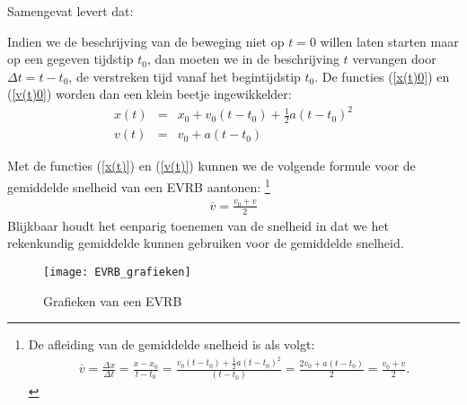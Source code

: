 \documentclass{ximera}
\begin{document}
	Samengevat levert dat:
	
	
	Indien we de beschrijving van de beweging niet op $t=0$ willen laten starten maar op een gegeven tijdstip $t_0$, dan moeten we in de beschrijving $t$ vervangen door $\Delta t= t-t_0$, de verstreken tijd vanaf het begintijdstip $t_0$. De functies (\ref{x(t)0}) en (\ref{v(t)0}) worden dan een klein beetje ingewikkelder:
	\begin{eqnarray}
	x(t)&=&x_0+v_0(t-t_0)+\frac{1}{2}a(t-t_0)^2\label{x(t)}\\
	v(t)&=&v_0+a(t-t_0)\label{v(t)}
	\end{eqnarray}
	
	Met de functies (\ref{x(t)}) en (\ref{v(t)}) kunnen we de volgende formule voor de gemiddelde snelheid van een EVRB aantonen:%
	\footnote{De afleiding van de gemiddelde snelheid is als volgt:
	\begin{eqnarray*}
	\overline{v}=\frac{\Delta x}{\Delta t}=\frac{x-x_0}{t-t_0}=\frac{v_0(t-t_0)+\frac{1}{2}a(t-t_0)^2}{(t-t_0)}=\frac{2v_0+a(t-t_0)}{2}=\frac{v_0+v}{2}.
	\end{eqnarray*}}
	\begin{eqnarray*}
	  \overline{v}=\frac{v_0+v}{2}
	\end{eqnarray*}
	Blijkbaar houdt het eenparig toenemen van de snelheid in dat we het rekenkundig gemiddelde kunnen gebruiken voor de gemiddelde snelheid.
	
	
	\begin{figure}[h]
	\centering
	\texttt{[image: EVRB\_grafieken]}
	\caption{Grafieken van een EVRB}
	\end{figure}
	
\end{document}
